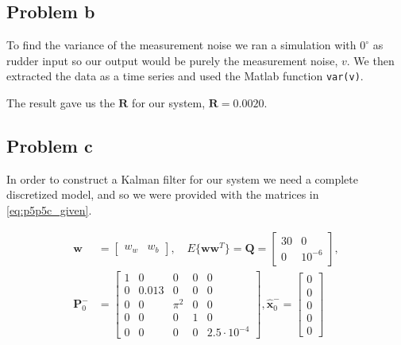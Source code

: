 \subsection{Problem b}

To find the variance of the measurement noise we ran a simulation with $0^{\circ}$ as rudder input so our output would be purely the measurement noise, $v$. We then extracted the data as a time series and used the Matlab function \texttt{var(v)}.

The result gave us the $\mathbf{R}$ for our system, $\mathbf{R} = 0.0020$.


\subsection{Problem c}

In order to construct a Kalman filter for our system we need a complete discretized model, and so we were provided with the matrices in \cref{eq:p5p5c_given}.

\begin{equation} \label{eq:p5p5c_given}
\begin{aligned}
    \mathbf{w} &= 
    \begin{bmatrix} w_w & w_b \end{bmatrix}, 
    \quad
    E\{\mathbf{ww}^T\} = \mathbf{Q} = 
    \begin{bmatrix}
        30 & 0 \\
        0  & 10^{-6}
    \end{bmatrix},
    \\
    \mathbf{P}_0^- &= 
    \begin{bmatrix} 
    1 &   0   &   0   & 0 &  0 \\
    0 & 0.013 &   0   & 0 &  0 \\
    0 &   0   & \pi^2 & 0 &  0 \\
    0 &   0   &   0   & 1 &  0 \\
    0 &   0   &   0   & 0 & 2.5 \cdot 10^{-4}
    \end{bmatrix}, 
    \mathbf{\hat{x}}_0^- = 
    \begin{bmatrix} 
    0 \\
    0 \\
    0 \\
    0 \\
    0 
    \end{bmatrix}
\end{aligned}
\end{equation}

